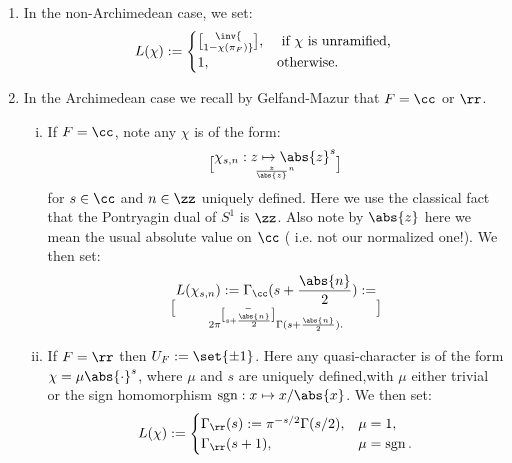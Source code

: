 \documentclass[11pt, x11names, openany]{book}
\begin{document}
\begin{enumerate}[(1)]
    \item In the non-Archimedean case, we set:
    \begin{equation}
        \label{eqn: non-Arch local L-factor}
        L(\chi) := \begin{cases}
            \inv{\brack{1 - \chi(\pi_F)}}, & \text{ if } \chi \text{ is unramified,}\\
            1, & \text{otherwise}.
        \end{cases}
    \end{equation}
    \item In the Archimedean case we recall by Gelfand-Mazur that $F = \cc$ or $\rr$. 
    \begin{enumerate}[(i)]
        \item If $F = \cc$, note any $\chi$ is of the form:
        \begin{equation*}
            \chi_{s, n}: z \mapsto \abs{z}^s \brack{\frac{z}{\abs{z}}}^n
        \end{equation*}
         for $s \in \cc$ and $n \in \zz$ uniquely defined. Here we use the classical fact that the Pontryagin dual of $S^1$ is $\zz$. Also note by $\abs{z}$ here we mean the usual absolute value on $\cc$ ( i.e. not our normalized one!). We then set:
         \begin{equation}
        \label{eqn: complex local L-factor}
            L(\chi_{s, n}) := \Gamma_\cc(s + \frac{\abs{n}}{2}) := \brack{2 \pi}^{-\brack{s + \frac{\abs{n}}{2}}}\Gamma(s + \frac{\abs{n}}{2}).
         \end{equation} 
         \item If $F = \rr$ then $U_F := \set{\pm 1}$. Here any quasi-character is of the form $\chi = \mu \abs{\cdot}^s$, where $\mu$ and $s$ are uniquely defined,with $\mu$ either trivial or the sign homomorphism $\sgn: x \mapsto x/\abs{x}$. We then set:
         \begin{equation}
        \label{eqn: real local L-factor}
             L(\chi) := \begin{cases}
                 \Gamma_\rr(s) := \pi^{-s/2}\Gamma(s/2), & \mu = 1,\\
                 \Gamma_\rr(s+1), & \mu = \sgn.
             \end{cases}
         \end{equation}
    \end{enumerate}
\end{enumerate}
\end{document}
